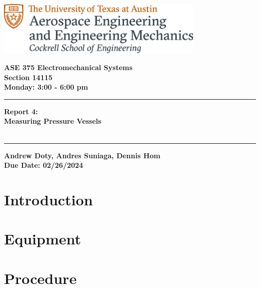 \documentclass{article}
\begin{document}
\begin{titlepage}
  \centering
  \includegraphics[width=10cm]{ase-logo-formal.png}  %
  \vspace{1cm}  %
 
  \Large \textbf{ASE 375 Electromechanical Systems}\\
  \large \textbf{Section 14115}\\
  \vspace{0.5cm}
  \textbf{Monday: 3:00 - 6:00 pm}\\
 
  \vspace{1cm}
 
  \hrule
  \vspace{0.5cm}
 
  \Huge \textbf{Report 4:\\
  Measuring Pressure Vessels}\\
  \Huge \textbf{}\\
 
  \vspace{0.5cm}
  \hrule
 
  \vspace{1cm}
 
  \normalsize \textbf{Andrew Doty, Andres Suniaga, Dennis Hom}\\
  \normalsize \textbf{Due Date: 02/26/2024}
 
\end{titlepage}
\newpage

\tableofcontents
\thispagestyle{empty}
\newpage

\section{Introduction}

\section{Equipment}

\section{Procedure}
\end{document}
